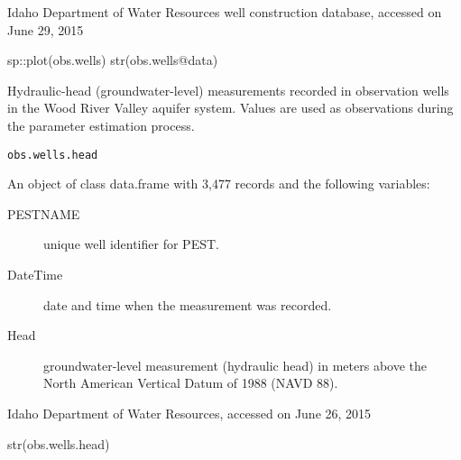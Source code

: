 \documentclass[a4paper]{book}
\begin{document}
%
\begin{Source}\relax
Idaho Department of Water Resources well construction database,
accessed on June 29, 2015
\end{Source}
%
\begin{SeeAlso}\relax
{}
\end{SeeAlso}
%
\begin{Examples}
\begin{ExampleCode}
sp::plot(obs.wells)
str(obs.wells@data)

\end{ExampleCode}
\end{Examples}
%
\begin{Description}\relax
Hydraulic-head (groundwater-level) measurements recorded in observation wells in the
Wood River Valley aquifer system.
Values are used as observations during the parameter estimation process.
\end{Description}
%
\begin{Usage}
\begin{verbatim}
obs.wells.head
\end{verbatim}
\end{Usage}
%
\begin{Format}
An object of class data.frame with 3,477 records and the following variables:
\begin{description}

\item[PESTNAME] unique well identifier for PEST.
\item[DateTime] date and time when the measurement was recorded.
\item[Head] groundwater-level measurement (hydraulic head)
in meters above the North American Vertical Datum of 1988 (NAVD 88).

\end{description}

\end{Format}
%
\begin{Source}\relax
Idaho Department of Water Resources, accessed on June 26, 2015
\end{Source}
%
\begin{SeeAlso}\relax
{}
\end{SeeAlso}
%
\begin{Examples}
\begin{ExampleCode}
str(obs.wells.head)

\end{ExampleCode}
\end{Examples}
\end{document}
